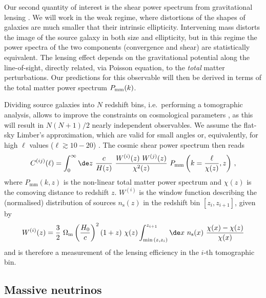 \documentclass[a4paper,11pt]{article}
\newcommand{\be}{\begin{equation}}
\newcommand{\ee}{\end{equation}}
\begin{document}
{Our second quantity of interest is the shear power spectrum from gravitational lensing \cite{Bartelmann_WL+01, Hoek_WL+08}. We will work in the weak regime, where distortions of the shapes of galaxies are much smaller that their intrinsic ellipticity. Intervening mass distorts the image of the source galaxy in both size and ellipticity, but in this regime the power spectra of the two components (convergence and shear) are statistically equivalent. The lensing effect depends on the gravitational potential along the line-of-sight, directly related, via Poisson equation, to the {\em total} matter perturbations. Our predictions for this observable will then be derived in terms of the total matter power spectrum $P_{\rm mm}(k)$.

Dividing source galaxies into $N$ redshift bins, i.e.~performing a tomographic analysis, allows to improve the constraints on cosmological parameters \cite{Takada_WL+04}, as this will result in $N(N+1)/2$ nearly independent observables. We assume the flat-sky Limber's approximation, which are valid for small angles or, equivalently, for high $\ell$ values ($\ell \gtrsim 10-20$) \cite{Kilbinger-full-sky+17}. The cosmic shear power spectrum then reads
\be
C^{(ij)}(\ell) = \int_0^\infty \de z \ \frac{c}{H(z)} \ \frac{W^{(i)}(z) \ W^{(j)}(z)}{\chi^2(z)} \ P_\mathrm{mm}\left(k=\frac{\ell}{\chi(z)}, z \right)\,,
\label{eq:shear}
\ee
where $P_\mathrm{mm}(k,z)$ is the non-linear total matter power spectrum and $\chi(z)$ is the comoving distance to redshift $z$.
$W^{(i)}$ is the window function describing the (normalised) distribution of sources $n_\mathrm s(z)$ in the redshift bin $[z_i, z_{i+1}]$, given by
\be
W^{(i)}(z) = \frac{3}{2} \ \Omega_\mathrm{m}  \left(\frac{H_0}{c}\right)^2 (1+z) \ \chi(z) \int_{\min{(z, z_i)}}^{z_{i+1}}  \de x \ n_\mathrm s(x) \ \frac{\chi(x)-\chi(z)}{\chi(x)}
\ee
and is therefore a measurement of the lensing efficiency in the $i$-th tomographic bin.


\subsection{Massive neutrinos}
\label{sec:feedback}

}
\end{document}
